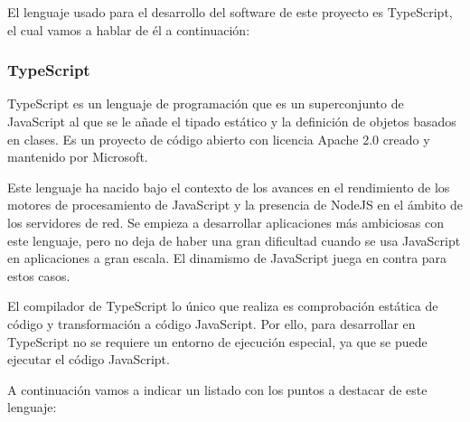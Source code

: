 \documentclass[spanish,12pt, a4paper, twoside]{paper}
\begin{document}
El lenguaje usado para el desarrollo del software de este proyecto es TypeScript, el cual vamos a hablar de él a continuación:

\subsubsection{TypeScript}

TypeScript es un lenguaje de programación que es un superconjunto de JavaScript al que se le añade el tipado estático y la definición de objetos basados en clases. Es un proyecto de código abierto con licencia Apache 2.0 creado y mantenido por Microsoft.
\newline

Este lenguaje ha nacido bajo el contexto de los avances en el rendimiento de los motores de procesamiento de JavaScript y la presencia de NodeJS en el ámbito de los servidores de red. Se empieza a desarrollar aplicaciones más ambiciosas con este lenguaje, pero no deja de haber una gran dificultad cuando se usa JavaScript en aplicaciones a gran escala. El dinamismo de JavaScript juega en contra para estos casos.
\newline

El compilador de TypeScript lo único que realiza es comprobación estática de código y transformación a código JavaScript. Por ello, para desarrollar en TypeScript no se requiere un entorno de ejecución especial, ya que se puede ejecutar el código JavaScript.
\newline

A continuación vamos a indicar un listado con los puntos a destacar de este lenguaje:
\end{document}
